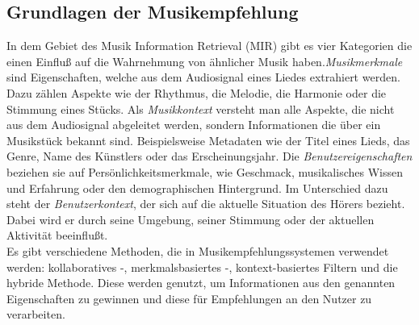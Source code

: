 \documentclass[twosided,a4,10pt]{article}
\begin{document}
\begin{multicols}{2}
		\section{Grundlagen der Musikempfehlung}
		In dem Gebiet des Musik Information Retrieval (MIR) gibt es vier Kategorien \cite{schedl} die einen Einfluß auf die Wahrnehmung von ähnlicher Musik haben.\newline \textit{Musikmerkmale} sind Eigenschaften, welche aus dem Audiosignal eines Liedes extrahiert werden. Dazu zählen Aspekte wie der Rhythmus, die Melodie, die Harmonie oder die Stimmung eines Stücks.\newline
		Als \textit{Musikkontext} versteht man alle Aspekte, die nicht aus dem Audiosignal abgeleitet werden, sondern Informationen die über ein Musikstück bekannt sind. Beispielsweise Metadaten wie der Titel eines Lieds, das Genre, Name des Künstlers oder das Erscheinungsjahr.\newline
		Die \textit{Benutzereigenschaften} beziehen sie auf Persönlichkeitsmerkmale, wie Geschmack, musikalisches Wissen und Erfahrung oder den demographischen Hintergrund.\newline
		Im Unterschied dazu steht der \textit{Benutzerkontext}, der sich auf die aktuelle Situation des Hörers bezieht. Dabei wird er durch seine Umgebung, seiner Stimmung oder der aktuellen Aktivität beeinflußt. \cite{knees}\newline\\
		Es gibt verschiedene Methoden, die in Musikempfehlungssystemen verwendet werden: kollaboratives -, merkmalsbasiertes -, kontext-basiertes Filtern und die hybride Methode. Diese werden genutzt, um Informationen aus den genannten Eigenschaften zu gewinnen und diese für Empfehlungen an den Nutzer zu verarbeiten. \cite{wang}
	

\end{multicols}
\end{document}
